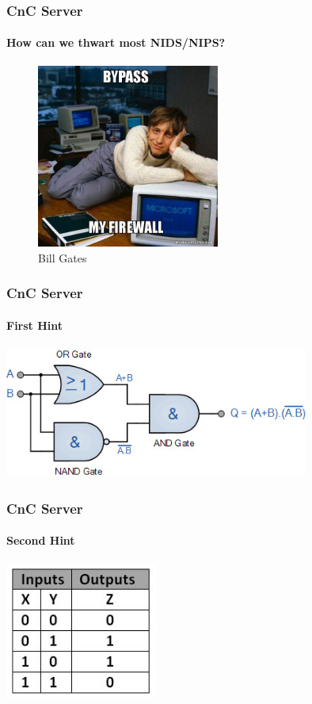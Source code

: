 \documentclass[aspectratio=169]{beamer}
\begin{document}
\begin{frame}
  \frametitle{CnC Server}
  \framesubtitle{How can we thwart most NIDS/NIPS?}
  \begin{center}
    \begin{figure}
      \includegraphics[width=6cm,keepaspectratio]{bypass_firewall}
      \caption{Bill Gates}
    \end{figure}
  \end{center}
\end{frame}

\begin{frame}
  \frametitle{CnC Server}
  \framesubtitle{First Hint}
  \begin{center}
    \includegraphics[width=10cm,keepaspectratio]{xor_gate}
  \end{center}
\end{frame}

\begin{frame}
  \frametitle{CnC Server}
  \framesubtitle{Second Hint}
  \begin{center}
    \includegraphics[width=5cm,keepaspectratio]{xor_truth_table}
  \end{center}
\end{frame}
\end{document}

